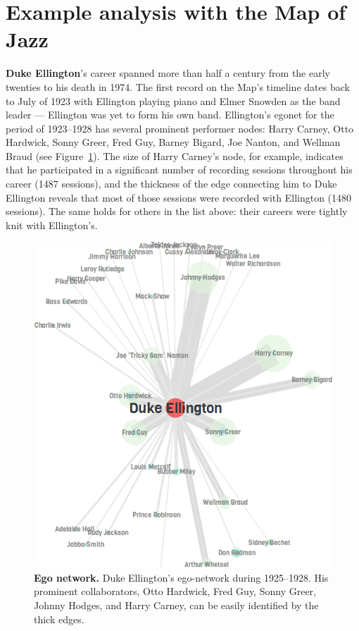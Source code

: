 \documentclass[12pt]{cmuthesis}
\begin{document}
\section{Example analysis with the Map of Jazz}

  \textbf{Duke Ellington}'s career spanned more than half a century from the early twenties to his death in 1974. The first record on the Map's timeline dates back to July of 1923 with Ellington playing piano and Elmer Snowden as the band leader --- Ellington was yet to form his own band. Ellington's egonet for the period of 1923--1928 has several prominent performer nodes: Harry Carney, Otto Hardwick, Sonny Greer, Fred Guy,  Barney Bigard, Joe Nanton, and Wellman Braud (see Figure~\ref{fig:moj:duke-ell}). The size of Harry Carney's node, for example, indicates that he participated in a significant number of recording sessions throughout his career (1487 sessions), and the thickness of the edge connecting him to Duke Ellington reveals that most of those sessions were recorded with Ellington (1480 sessions). The same holds for others in the list above: their careers were tightly knit with Ellington's.


  \begin{figure}[tb!]
    \centering
    \includegraphics[width=0.7\linewidth]{figures/duke-ellington-1925-1928}
    \caption{\textbf{Ego network.} Duke Ellington's ego-network during 1925--1928. His prominent collaborators, Otto Hardwick, Fred Guy, Sonny Greer, Johnny Hodges, and Harry Carney, can be easily identified by the thick edges.}
    \label{fig:moj:duke-ell}
  \end{figure}
\end{document}

